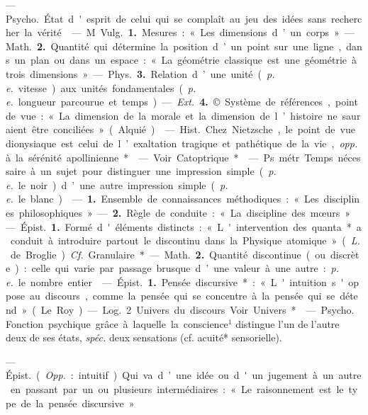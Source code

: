 \begin{itemize}[leftmargin=1cm, label=, itemsep=1pt]
 — \si{Psycho.} État d'esprit de celui qui se complaît au jeu
des idées sans rechercher la vérité.

 — M \si{Vulg.} {\bf 1.} Mesures :
« Les dimensions d’un corps ». —
\si{Math.} {\bf 2.} Quantité qui détermine
la position d’un point sur une ligne,
dans un plan ou dans un espace :
« La géométrie classique est une
géométrie à trois dimensions ». —
\si{Phys.} {\bf 3.} Relation d’une unité ({\it p. e.}
vitesse) aux unités fondamentales
({\it p. e.} longueur parcourue et temps).

— {\it Ext.} {\bf 4.} © Système de références, point de vue : « La dimension de la morale et la dimension
de l’histoire ne sauraient être conciliées » (Alquié).

 — \si{Hist.} Chez Nietzsche,
le point de vue dionysiaque est celui
de l’exaltation tragique et pathétique de la vie, {\it opp.} à la sérénité
apollinienne*.

 — Voir Catoptrique*.

 — Ps.
métr. Temps nécessaire à un sujet
pour distinguer une impression
simple ({\it p. e.} le noir) d’une autre impression simple ({\it p. e.} le blanc).

 — {\bf 1.} Ensemble de connaissances méthodiques : « Les
disciplines philosophiques » — {\bf 2.}
Règle de conduite : « La discipline
des mœurs. »

 — \si{Épist.} {\bf 1.} Formé d'éléments distincts : « L'intervention
des quanta* a conduit à introduire
partout le discontinu dans la Physique atomique » ({\it L.} de Broglie). {\it Cf.}
Granulaire*.

— \si{Math.} {\bf 2.} Quantité discontinue
(ou discrète) : celle qui varie par passage brusque d’une valeur à une
autre : {\it p. e.} le nombre entier.

 — \si{Épist.} {\bf 1.} Pensée discursive* : « L'intuition s'oppose au discours, comme la pensée qui se concentre à la pensée qui se détend »
(Le Roy).

— \si{Log.} 2 Univers du discours.
Voir Univers*.

 — \si{Psycho.} Fonction
psychique grâce à laquelle la conscience$^1$ distingue l’un de l'autre
deux de ses états, {\it spéc.} deux sensations (cf. acuité* sensorielle).

 — \si{Épist.} ({\it Opp.} : intuitif).
Qui va d’une idée ou d'un jugement
à un autre en passant par un ou plusieurs intermédiaires : « Le raisonnement est le type de la pensée
discursive. »


\end{itemize}
